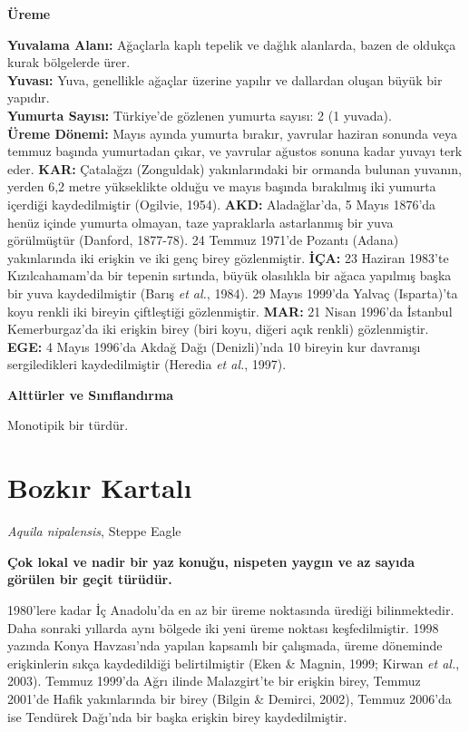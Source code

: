 \documentclass[
  a4paper,
  DIV=11,
  numbers=noendperiod]{scrreprt}
\begin{document}
\textbf{Üreme}

\textbf{Yuvalama Alanı:} Ağaçlarla kaplı tepelik ve dağlık alanlarda,
bazen de oldukça kurak bölgelerde ürer.\\
\textbf{Yuvası:} Yuva, genellikle ağaçlar üzerine yapılır ve dallardan
oluşan büyük bir yapıdır.\\
\textbf{Yumurta Sayısı:} Türkiye'de gözlenen yumurta sayısı: 2 (1
yuvada).\\
\textbf{Üreme Dönemi:} Mayıs ayında yumurta bırakır, yavrular haziran
sonunda veya temmuz başında yumurtadan çıkar, ve yavrular ağustos sonuna
kadar yuvayı terk eder. \textbf{KAR:} Çatalağzı (Zonguldak)
yakınlarındaki bir ormanda bulunan yuvanın, yerden 6,2 metre yükseklikte
olduğu ve mayıs başında bırakılmış iki yumurta içerdiği kaydedilmiştir
(Ogilvie, 1954). \textbf{AKD:} Aladağlar'da, 5 Mayıs 1876'da henüz
içinde yumurta olmayan, taze yapraklarla astarlanmış bir yuva
görülmüştür (Danford, 1877-78). 24 Temmuz 1971'de Pozantı (Adana)
yakınlarında iki erişkin ve iki genç birey gözlenmiştir. \textbf{İÇA:}
23 Haziran 1983'te Kızılcahamam'da bir tepenin sırtında, büyük
olasılıkla bir ağaca yapılmış başka bir yuva kaydedilmiştir (Barış
\emph{et al.}, 1984). 29 Mayıs 1999'da Yalvaç (Isparta)'ta koyu renkli
iki bireyin çiftleştiği gözlenmiştir. \textbf{MAR:} 21 Nisan 1996'da
İstanbul Kemerburgaz'da iki erişkin birey (biri koyu, diğeri açık
renkli) gözlenmiştir. \textbf{EGE:} 4 Mayıs 1996'da Akdağ Dağı
(Denizli)'nda 10 bireyin kur davranışı sergiledikleri kaydedilmiştir
(Heredia \emph{et al.}, 1997).

\textbf{Alttürler ve Sınıflandırma}

Monotipik bir türdür.

\section{Bozkır Kartalı}\label{bozkux131r-kartalux131}

\emph{Aquila nipalensis}, Steppe Eagle

\textbf{Çok lokal ve nadir bir yaz konuğu, nispeten yaygın ve az sayıda
görülen bir geçit türüdür.}

1980'lere kadar İç Anadolu'da en az bir üreme noktasında ürediği
bilinmektedir. Daha sonraki yıllarda aynı bölgede iki yeni üreme noktası
keşfedilmiştir. 1998 yazında Konya Havzası'nda yapılan kapsamlı bir
çalışmada, üreme döneminde erişkinlerin sıkça kaydedildiği
belirtilmiştir (Eken \& Magnin, 1999; Kirwan \emph{et al.}, 2003).
Temmuz 1999'da Ağrı ilinde Malazgirt'te bir erişkin birey, Temmuz
2001'de Hafik yakınlarında bir birey (Bilgin \& Demirci, 2002), Temmuz
2006'da ise Tendürek Dağı'nda bir başka erişkin birey kaydedilmiştir.
\end{document}
